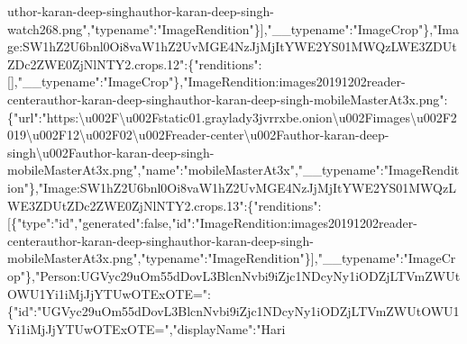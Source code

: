 uthor-karan-deep-singhauthor-karan-deep-singh-watch268.png","typename":"ImageRendition"\}{]},"\_\_typename":"ImageCrop"\},"Image:SW1hZ2U6bnl0Oi8vaW1hZ2UvMGE4NzJjMjItYWE2YS01MWQzLWE3ZDUtZDc2ZWE0ZjNlNTY2.crops.12":\{"renditions":{[}{]},"\_\_typename":"ImageCrop"\},"ImageRendition:images20191202reader-centerauthor-karan-deep-singhauthor-karan-deep-singh-mobileMasterAt3x.png":\{"url":"https:\textbackslash{}u002F\textbackslash{}u002Fstatic01.graylady3jvrrxbe.onion\textbackslash{}u002Fimages\textbackslash{}u002F2019\textbackslash{}u002F12\textbackslash{}u002F02\textbackslash{}u002Freader-center\textbackslash{}u002Fauthor-karan-deep-singh\textbackslash{}u002Fauthor-karan-deep-singh-mobileMasterAt3x.png","name":"mobileMasterAt3x","\_\_typename":"ImageRendition"\},"Image:SW1hZ2U6bnl0Oi8vaW1hZ2UvMGE4NzJjMjItYWE2YS01MWQzLWE3ZDUtZDc2ZWE0ZjNlNTY2.crops.13":\{"renditions":{[}\{"type":"id","generated":false,"id":"ImageRendition:images20191202reader-centerauthor-karan-deep-singhauthor-karan-deep-singh-mobileMasterAt3x.png","typename":"ImageRendition"\}{]},"\_\_typename":"ImageCrop"\},"Person:UGVyc29uOm55dDovL3BlcnNvbi9iZjc1NDcyNy1iODZjLTVmZWUtOWU1Yi1iMjJjYTUwOTExOTE=":\{"id":"UGVyc29uOm55dDovL3BlcnNvbi9iZjc1NDcyNy1iODZjLTVmZWUtOWU1Yi1iMjJjYTUwOTExOTE=","displayName":"Hari
